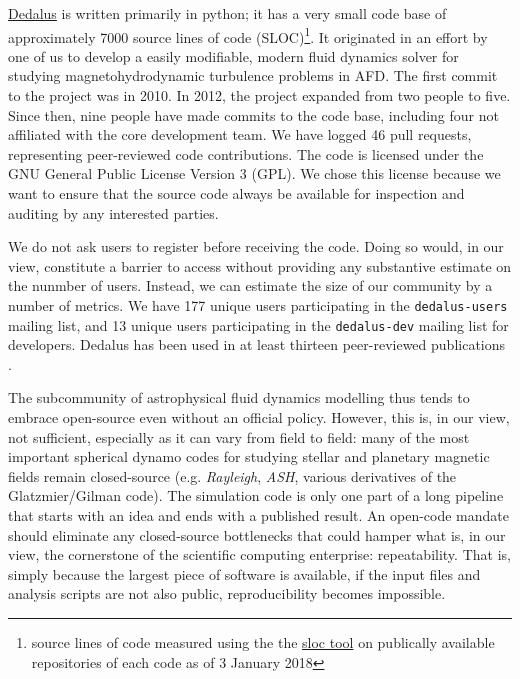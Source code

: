 \documentclass[12pt, preprint]{aastex}
\newcommand{\dedalus}{\href{http://dedalus-project.org}{Dedalus}}
\begin{document}
\dedalus{} is written primarily in python; it has a very small code base of approximately 7000 source lines of code (SLOC)\footnote{source lines of code measured using the the \href{https://github.com/bytbox/sloc}{sloc tool} on publically available repositories of each code as of 3 January 2018}. It originated in an effort by one of us to develop a easily modifiable, modern fluid dynamics solver for studying magnetohydrodynamic turbulence problems in AFD. The first commit to the project was in 2010. In 2012, the project expanded from two people to five. Since then, nine people have made commits to the code base, including four not affiliated with the core development team. We have logged 46 pull requests, representing peer-reviewed code contributions. The code is licensed under the GNU General Public License Version 3 (GPL). We chose this license because we want to ensure that the source code always be available for inspection and auditing by any interested parties. 

We do not ask users to register before receiving the code. Doing so would, in our view, constitute a barrier to access without providing any substantive estimate on the nunmber of users. Instead, we can estimate the size of our community by a number of metrics. We have 177 unique users participating in the \texttt{dedalus-users} mailing list, and 13 unique users participating in the \texttt{dedalus-dev} mailing list for developers. Dedalus has been used in at least thirteen peer-reviewed publications \citep{2017PhRvF...2h3501A,PhysRevFluids.2.094804,2017ApJ...841....1C,2017ApJ...841....2C,2017MNRAS.466.2181L,2016ApJ...832...71L,2016JCoPh.325...53V,2016PhRvE..94e3206D,2016PhRvL.116j5004D,2016MNRAS.455.4274L,2015PhRvE..91f3016L,2014ApJ...797...94L}.

The subcommunity of astrophysical fluid dynamics modelling thus tends to embrace open-source even without an official policy. However, this is, in our view, not sufficient, especially as it can vary from field to field: many of the most important spherical dynamo codes for studying stellar and planetary magnetic fields remain closed-source (e.g. \emph{Rayleigh}, \emph{ASH}, various derivatives of the Glatzmier/Gilman code). The simulation code is only one part of a long pipeline that starts with an idea and ends with a published result. An open-code mandate should eliminate any closed-source bottlenecks that could hamper what is, in our view, the cornerstone of the scientific computing enterprise: repeatability. That is, simply because the largest piece of software is available, if the input files and analysis scripts are not also public, reproducibility becomes impossible. 
\end{document}
